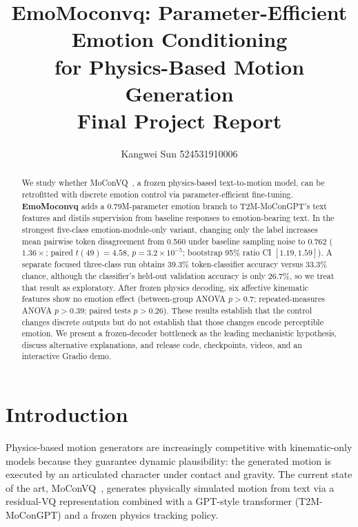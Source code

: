 \documentclass[conference]{IEEEtran}
\begin{document}
\title{EmoMoconvq: Parameter-Efficient Emotion Conditioning\\
for Physics-Based Motion Generation\\[3pt]
\large Final Project Report}

\author{Kangwei Sun 524531910006}

\maketitle

\begin{abstract}
We study whether MoConVQ~\cite{yao2023moconvq}, a frozen physics-based
text-to-motion model, can be retrofitted with discrete emotion control via
parameter-efficient fine-tuning. \textbf{EmoMoconvq} adds a 0.79M-parameter
emotion branch to T2M-MoConGPT's text features and distils supervision from
baseline responses to emotion-bearing text. In the strongest five-class
emotion-module-only variant, changing only the label increases mean pairwise
token disagreement from 0.560 under baseline sampling noise to 0.762
($1.36\!\times$; paired $t(49)=4.58$, $p=3.2\times10^{-5}$; bootstrap 95\%
ratio CI $[1.19,1.59]$). A separate focused three-class run obtains 39.3\%
token-classifier accuracy versus 33.3\% chance, although the classifier's
held-out validation accuracy is only 26.7\%, so we treat that result as
exploratory. After frozen physics decoding, six affective kinematic features
show no emotion effect (between-group ANOVA $p>0.7$; repeated-measures ANOVA
$p>0.39$; paired tests $p>0.26$). These results establish that the control
changes discrete outputs but do not establish that those changes encode
perceptible emotion. We present a frozen-decoder bottleneck as the leading
mechanistic hypothesis, discuss alternative explanations, and release code,
checkpoints, videos, and an interactive Gradio demo.
\end{abstract}

\IEEEpeerreviewmaketitle

\section{Introduction}
Physics-based motion generators are increasingly competitive with
kinematic-only models because they guarantee dynamic plausibility: the
generated motion is executed by an articulated character under contact and
gravity. The current state of the art, MoConVQ~\cite{yao2023moconvq},
generates physically simulated motion from text via a residual-VQ
representation combined with a GPT-style transformer (T2M-MoConGPT) and a
frozen physics tracking policy.
\end{document}

